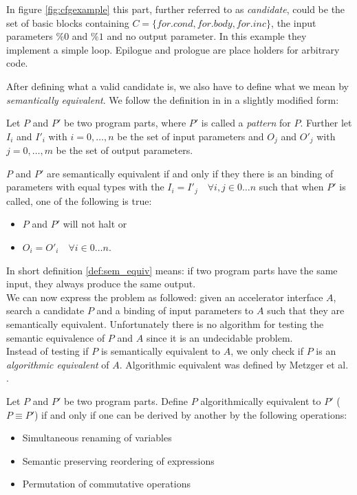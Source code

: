 In figure \ref{fig:cfgexample} this part, further referred to as \textit{candidate}, could be the set of basic blocks containing $C = \{for.cond, for.body, for.inc\}$, the input parameters $ \%0$ and $ \%1 $ and no output parameter. In this example they implement a simple loop. Epilogue and prologue are place holders for arbitrary code.

After defining what a valid candidate is, we also have to define what we mean by \textit{semantically equivalent}. We follow the definition in \cite{2000automatic} in a slightly modified form:

\begin{defn}
\label{def:sem_equiv}
Let $P$ and $P'$ be two program parts, where $P'$ is called a \textit{pattern} for $P$. Further let $I_i$ and $I'_i$ with $i = 0,\dots,n$ be the set of input parameters and $O_j$ and $O'_j$ with $j=0,\dots,m$ be the set of output parameters. 

$P$ and $P'$ are semantically equivalent if and only if they there is an binding of parameters with equal types with the $I_i = I'_j \quad \forall i,j \in 0 \dots n$ such that when $P'$ is called, one of the following is true:
\begin{itemize}
\item $P$ and $P'$ will not halt or
\item $O_i =O'_i \quad \forall i \in 0 \dots n$.
\end{itemize}
\end{defn}

In short definition \ref{def:sem_equiv} means: if two program parts have the same input, they always produce the same output. 
\\

We can now express the problem as followed: given an accelerator interface $A$, search a candidate $P$ and a binding of input parameters to $A$ such that they are semantically equivalent. Unfortunately there is no algorithm for testing the semantic equivalence of $P$ and $A$ since it is an undecidable problem.
\\

Instead of testing if $P$ is semantically equivalent to $A$, we only check if $P$ is an \textit{algorithmic equivalent} of $A$. Algorithmic equivalent was defined by Metzger et al. \cite{2000automatic}.

\begin{defn}
Let $P$ and $P'$ be two program parts. Define $P$ algorithmically equivalent to $P'$ ($P \equiv P'$)  if and only if one can be derived by another by the following operations:
\begin{itemize}
\item Simultaneous renaming of variables
\item Semantic preserving reordering of expressions
\item Permutation of commutative operations
\end{itemize}
\end{defn}

